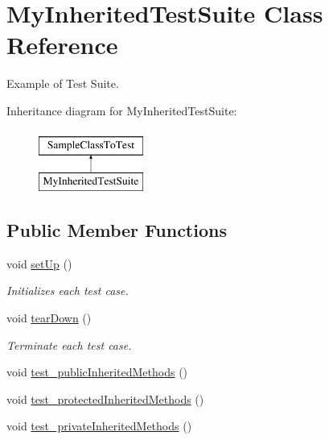 \hypertarget{class_my_inherited_test_suite}{}\section{My\+Inherited\+Test\+Suite Class Reference}
\label{class_my_inherited_test_suite}


Example of Test Suite.  


Inheritance diagram for My\+Inherited\+Test\+Suite\+:\begin{figure}[H]
\begin{center}
\leavevmode
\includegraphics[height=2.000000cm]{class_my_inherited_test_suite}
\end{center}
\end{figure}
\subsection*{Public Member Functions}
\begin{DoxyCompactItemize}
\item 
void \mbox{\hyperlink{class_my_inherited_test_suite_a3aa9d1d4ab762d55cfee1d2f6298c3f9}{set\+Up}} ()
\begin{DoxyCompactList}\small\item\em Initializes each test case. \end{DoxyCompactList}\item 
void \mbox{\hyperlink{class_my_inherited_test_suite_abbd94d1b4868f8252b001ce743eeb691}{tear\+Down}} ()
\begin{DoxyCompactList}\small\item\em Terminate each test case. \end{DoxyCompactList}\item 
void \mbox{\hyperlink{class_my_inherited_test_suite_a1a6a926a8fb9d03618008b6d882a1cfe}{test\+\_\+public\+Inherited\+Methods}} ()
\item 
void \mbox{\hyperlink{class_my_inherited_test_suite_a7fef4b3ee5331b5454ce3b6b66813e6d}{test\+\_\+protected\+Inherited\+Methods}} ()
\item 
void \mbox{\hyperlink{class_my_inherited_test_suite_a17797338b2152e4c8d5354f2efd30692}{test\+\_\+private\+Inherited\+Methods}} ()
\end{DoxyCompactItemize}


